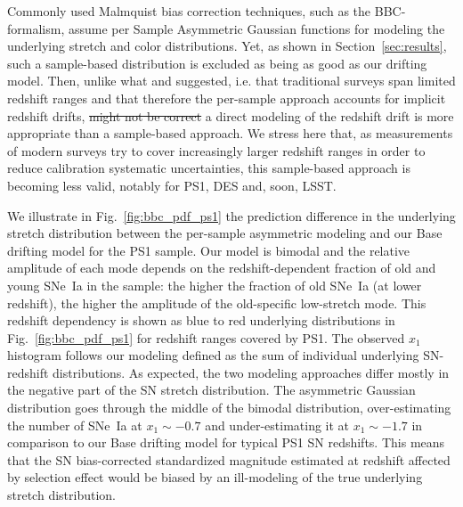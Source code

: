 \documentclass[]{aa} %
\newcommand{\mr}[1]{{\textcolor[rgb]{0.60,0.10,0.6}{#1}}}
\newcommand{\nn}[1]{{\textcolor[rgb]{0.25, 0.50, 0}{#1}}}
\begin{document}
Commonly used Malmquist bias correction techniques, such as the BBC-formalism, assume per Sample Asymmetric Gaussian functions for modeling the underlying stretch and color distributions.
Yet, as shown in Section~\ref{sec:results}, such a sample-based distribution is excluded as being as good as our drifting model.
Then, unlike what \citet[][section~2]{scolnic2016} and
\citet[][section~5.4]{scolnic2018a} suggested, i.e. that
traditional surveys span limited redshift ranges and that therefore the per-sample approach accounts for implicit redshift drifts, \sout{might not be correct} \nn{a direct modeling of the redshift drift is more appropriate than a sample-based approach}. We stress here that, as measurements of modern surveys try to cover increasingly larger redshift ranges in order to reduce calibration systematic uncertainties, this sample-based approach is becoming less valid, notably for PS1, DES and, soon, LSST.

We illustrate in Fig.~\ref{fig:bbc_pdf_ps1} the prediction difference in the
underlying stretch distribution between the per-sample asymmetric modeling and our Base drifting
model for the PS1 sample. Our model is bimodal and the relative amplitude of
each mode depends on the redshift-dependent fraction of old and young SNe~Ia in
the sample: the higher the fraction of old SNe~Ia (at lower redshift), the
higher the amplitude of the old-specific low-stretch mode. This redshift
dependency is shown as blue to red underlying distributions in
Fig.~\ref{fig:bbc_pdf_ps1} for redshift ranges covered by PS1. The observed
$x_1$ histogram follows our modeling defined as the sum of individual underlying SN-redshift distributions. As expected, the two modeling approaches differ mostly in the negative part of the SN stretch distribution. The asymmetric Gaussian distribution goes through the middle of the
bimodal distribution, over-estimating the number of SNe~Ia at $x_1\sim-0.7$ and
under-estimating it at $x_1\sim-1.7$ in comparison to our Base drifting model for typical PS1 SN redshifts. \mr{This means that the SN bias-corrected standardized magnitude estimated at redshift affected by selection effect would be biased by an ill-modeling of the true underlying stretch distribution.}
\end{document}

